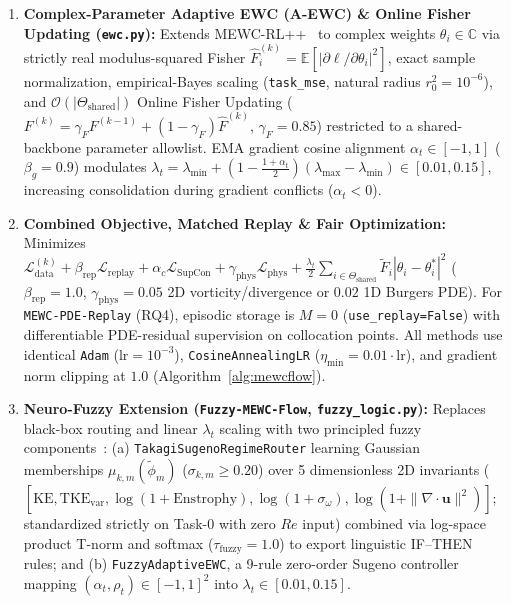 \documentclass[11pt,a4paper]{article}
\begin{document}
\begin{enumerate}
  \item \textbf{Complex-Parameter Adaptive EWC (A-EWC) \& Online Fisher Updating (\texttt{ewc.py}):} Extends MEWC-RL++~\cite{hasan2026mewcrlpp} to complex weights $\theta_i \in \mathbb{C}$ via strictly real modulus-squared Fisher $\hat{F}_i^{(k)} = \mathbb{E}[|\partial \ell / \partial \theta_i|^2]$, exact sample normalization, empirical-Bayes scaling (\texttt{task\_mse}, natural radius $r_0^2 = 10^{-6}$), and $\mathcal{O}(|\Theta_{\text{shared}}|)$ Online Fisher Updating ($F^{(k)} = \gamma_F F^{(k-1)} + (1-\gamma_F)\hat{F}^{(k)}$, $\gamma_F = 0.85$) restricted to a shared-backbone parameter allowlist. EMA gradient cosine alignment $\alpha_t \in [-1, 1]$ ($\beta_g = 0.9$) modulates $\lambda_t = \lambda_{\min} + \left(1 - \frac{1+\alpha_t}{2}\right)(\lambda_{\max} - \lambda_{\min}) \in [0.01, 0.15]$, increasing consolidation during gradient conflicts ($\alpha_t < 0$).

  \item \textbf{Combined Objective, Matched Replay \& Fair Optimization:} Minimizes $\mathcal{L}_{\text{data}}^{(k)} + \beta_{\text{rep}}\mathcal{L}_{\text{replay}} + \alpha_c \mathcal{L}_{\text{SupCon}} + \gamma_{\text{phys}}\mathcal{L}_{\text{phys}} + \frac{\lambda_t}{2}\sum_{i\in\Theta_{\text{shared}}} \tilde{F}_i|\theta_i - \theta_i^*|^2$ ($\beta_{\text{rep}}=1.0$, $\gamma_{\text{phys}}=0.05$ 2D vorticity/divergence or $0.02$ 1D Burgers PDE). For \texttt{MEWC-PDE-Replay} (RQ4), episodic storage is $M=0$ (\texttt{use\_replay=False}) with differentiable PDE-residual supervision on collocation points. All methods use identical \texttt{Adam} ($\text{lr}=10^{-3}$), \texttt{CosineAnnealingLR} ($\eta_{\min}=0.01\cdot\text{lr}$), and gradient norm clipping at $1.0$ (Algorithm~\ref{alg:mewcflow}).

  \item \textbf{Neuro-Fuzzy Extension (\texttt{Fuzzy-MEWC-Flow}, \texttt{fuzzy\_logic.py}):} Replaces black-box routing and linear $\lambda_t$ scaling with two principled fuzzy components~\cite{mamdani1974fuzzy,takagi1985fuzzy,jang1993anfis}: (a) \texttt{TakagiSugenoRegimeRouter} learning Gaussian memberships $\mu_{k,m}(\tilde{\phi}_m)$ ($\sigma_{k,m} \ge 0.20$) over 5 dimensionless 2D invariants ($[\text{KE}, \text{TKE}_{\text{var}}, \log(1+\text{Enstrophy}), \log(1+\sigma_{\omega}), \log(1+\|\nabla\cdot\mathbf{u}\|^2)]$; standardized strictly on Task-0 with zero $Re$ input) combined via log-space product T-norm and softmax ($\tau_{\text{fuzzy}}=1.0$) to export linguistic IF--THEN rules; and (b) \texttt{FuzzyAdaptiveEWC}, a 9-rule zero-order Sugeno controller mapping $(\alpha_t, \rho_t) \in [-1,1]^2$ into $\lambda_t \in [0.01, 0.15]$.
\end{enumerate}
\end{document}
